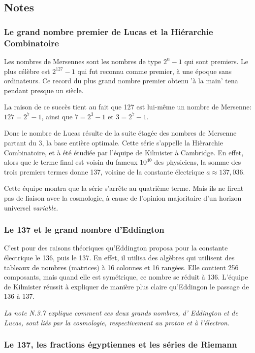 \documentclass[a4paper,12pt]{article}
\begin{document}
\subsection{Notes}


\subsubsection{Le grand nombre premier de Lucas et la Hiérarchie Combinatoire} 

      Les nombres de Mersennes sont les nombres de type $2^n -1$ qui sont premiers. Le plus célèbre est $2^{127}-1$  qui fut reconnu comme premier, à une époque sans ordinateurs. Ce record du plus grand nombre premier obtenu 'à la main' tena pendant presque un siècle.

La raison de ce succès tient au fait que 127 est lui-même un nombre de Mersenne: $127 = 2^7 -1$, ainsi que $7 = 2^3-1$ et $3 = 2^7-1$. 

Donc le nombre de Lucas résulte de la suite étagée des nombres de Mersenne partant du 3, la base entière optimale. Cette série s'appelle la Hièrarchie Combinatoire, et à été étudiée par l'équipe de Kilmister à Cambridge. En effet, alors que le terme final est voisin du fameux $10^40$ des physiciens, la somme des trois premiers termes donne 137, voisine de la constante électrique $a \approx 137,036$.

Cette équipe montra que la série s'arrête au quatrième terme. Mais ils ne firent pas de liaison avec la cosmologie, à cause de l'opinion majoritaire d'un horizon universel \textit{variable}. 


\subsubsection{Le 137 et le grand nombre d'Eddington}

     C'est pour des raisons théoriques qu'Eddington proposa pour la constante électrique le 136, puis le 137. En effet, il utilisa des algèbres qui utilisent des tableaux de nombres (matrices) à 16 colonnes et 16 rangées. Elle contient 256 composants, mais quand elle est symétrique, ce nombre se réduit à 136. L'équipe de Kilmister réussit à expliquer de manière plus claire qu'Eddingon le passage de 136 à 137.

      \textit{ La note N.3.7 explique comment ces deux grands nombres, d' Eddington et de Lucas, sont liés par la cosmologie, respectivement au proton et à l'électron.}


\subsubsection{Le 137, les fractions égyptiennes et les séries de Riemann}
  
\end{document}
